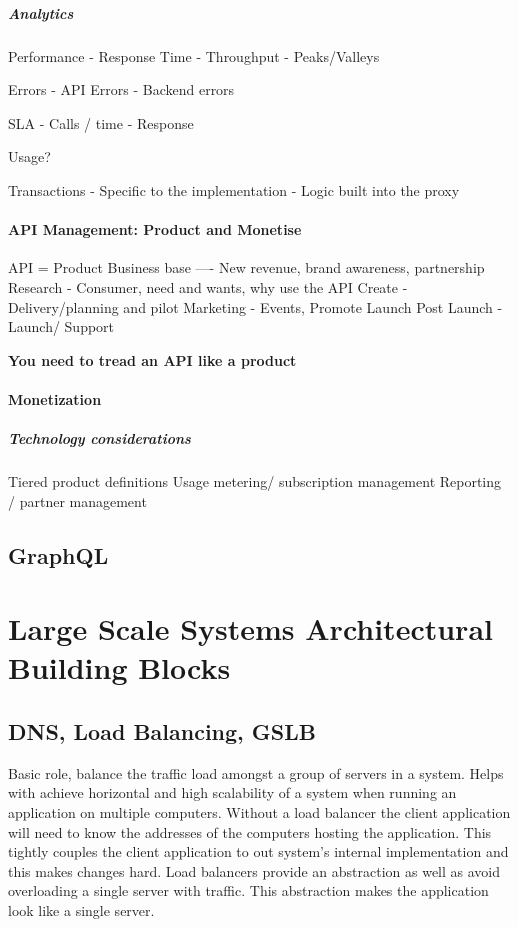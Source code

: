 \documentclass[a4paper, 11pt]{book}
\begin{document}
    \paragraph{Analytics}
    Performance
    - Response Time
    - Throughput
    - Peaks/Valleys

    Errors
    - API Errors
    - Backend errors

    SLA
    - Calls / time
    - Response

    Usage?

    Transactions
    - Specific to the implementation
    - Logic built into the proxy

    \subsubsection{API Management: Product and Monetise}
    API = Product
    Business base ---- New revenue, brand awareness, partnership
    Research - Consumer, need and wants, why use the API
    Create - Delivery/planning and pilot
    Marketing - Events, Promote
    Launch Post Launch - Launch/ Support

    \textbf{You need to tread an API like a product}

    \subsubsection{Monetization}

    \paragraph{Technology considerations}
    Tiered product definitions
    Usage metering/ subscription management
    Reporting / partner management


    \section{GraphQL}

    


    \chapter{Large Scale Systems Architectural Building Blocks}


    \section{DNS, Load Balancing, GSLB}
    Basic role, balance the traffic load amongst a group of servers in a system.
    Helps with achieve horizontal and high scalability of a system when running an application on multiple computers.
    Without a load balancer the client application will need to know the addresses of the computers hosting the application.
    This tightly couples the client application to out system's internal implementation and this makes changes hard.
    Load balancers provide an abstraction as well as avoid overloading a single server with traffic.
    This abstraction makes the application look like a single server.
\end{document}
